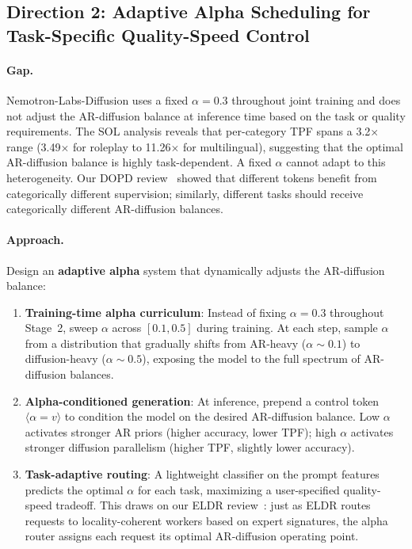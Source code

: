 \documentclass[11pt,a4paper]{article}
\begin{document}
\subsection{Direction 2: Adaptive Alpha Scheduling for Task-Specific Quality-Speed Control}

\paragraph{Gap.} Nemotron-Labs-Diffusion uses a fixed $\alpha = 0.3$ throughout joint training and does not adjust the AR-diffusion balance at inference time based on the task or quality requirements. The SOL analysis reveals that per-category TPF spans a 3.2$\times$ range (3.49$\times$ for roleplay to 11.26$\times$ for multilingual), suggesting that the optimal AR-diffusion balance is highly task-dependent. A fixed $\alpha$ cannot adapt to this heterogeneity. Our DOPD review~\cite{dopd2026} showed that different tokens benefit from categorically different supervision; similarly, different tasks should receive categorically different AR-diffusion balances.

\paragraph{Approach.} Design an \textbf{adaptive alpha} system that dynamically adjusts the AR-diffusion balance:
\begin{enumerate}
\item \textbf{Training-time alpha curriculum}: Instead of fixing $\alpha = 0.3$ throughout Stage~2, sweep $\alpha$ across $[0.1, 0.5]$ during training. At each step, sample $\alpha$ from a distribution that gradually shifts from AR-heavy ($\alpha \sim 0.1$) to diffusion-heavy ($\alpha \sim 0.5$), exposing the model to the full spectrum of AR-diffusion balances.
\item \textbf{Alpha-conditioned generation}: At inference, prepend a control token $\langle\alpha=v\rangle$ to condition the model on the desired AR-diffusion balance. Low $\alpha$ activates stronger AR priors (higher accuracy, lower TPF); high $\alpha$ activates stronger diffusion parallelism (higher TPF, slightly lower accuracy).
\item \textbf{Task-adaptive routing}: A lightweight classifier on the prompt features predicts the optimal $\alpha$ for each task, maximizing a user-specified quality-speed tradeoff. This draws on our ELDR review~\cite{eldr2026}: just as ELDR routes requests to locality-coherent workers based on expert signatures, the alpha router assigns each request its optimal AR-diffusion operating point.
\end{enumerate}
\end{document}
